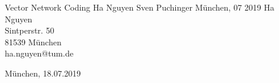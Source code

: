 \documentclass{CODthesis}
\theoremstyle{definition}
\theoremstyle{plain}
\theoremstyle{remark}
\theoremstyle{definition}
\theoremstyle{plain}
\theoremstyle{plain}
\begin{document}
    {Vector Network Coding}                  %
    {Ha Nguyen}                  %
    {Sven Puchinger}            %
    {M\"unchen, 07 2019}          %
    {Ha Nguyen\\                 %
    Sintperstr. 50\\
    81539 M\"unchen\\
    ha.nguyen@tum.de}

    {M\"unchen, 18.07.2019}         %

\cleardoubleemptypage   %


    \setcounter{page}{1}

        \tableofcontents    %
        \listoffigures      %
        \listoftables       %
        \cleardoubleemptypage   %


    \setcounter{page}{1}

	
	
	
    
    
      
       
        
        \cleardoubleemptypage



    \appendix
    \setcounter{page}{1}

        
        
\end{document}
